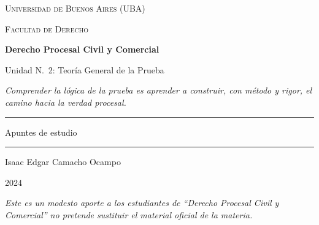 \documentclass[12pt,oneside]{book}
\newcommand{\universidad}{Universidad de Buenos Aires (UBA)}
\newcommand{\facultad}{Facultad de Derecho}
\newcommand{\materia}{Derecho Procesal Civil y Comercial}
\newcommand{\titulo}{Unidad N.\textordmasculine{}~2: Teoría General de la Prueba}
\newcommand{\autor}{Isaac Edgar Camacho Ocampo}
\newcommand{\anio}{2024}
\begin{document}
\begin{titlepage}

\thispagestyle{empty}

\begin{center}

\vspace*{1cm}

{\large \textsc{\universidad}}

\vspace{0.2cm}

{\large \textsc{\facultad}}

\vspace{3cm}

{\Huge \textbf{\materia}}

\vspace{1cm}

{\LARGE \titulo}

\vspace{0.8cm}

\textit{Comprender la lógica de la prueba es aprender a construir, con método y rigor, el camino hacia la verdad procesal.}

\vspace{1.2cm}

\rule{0.70\textwidth}{0.5pt}

\vspace{0.5cm}

{\large Apuntes de estudio}

\vspace{0.5cm}

\rule{0.70\textwidth}{0.5pt}

\vfill

{\large \autor}

\vspace{0.3cm}

{\large \anio}

\end{center}

\vfill

\begin{flushleft}
\textit{Este es un modesto aporte a los estudiantes de ``Derecho Procesal Civil y Comercial'' no pretende sustituir el material oficial de la materia.}
\end{flushleft}

\end{titlepage}
\end{document}
